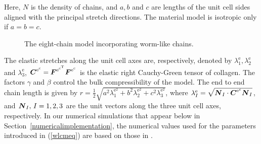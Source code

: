 Here, $N$ is
the density of chains, and $a,b$ and $c$ are lengths of the unit cell
sides aligned with the principal stretch directions. The material
model is isotropic only if $a=b=c$.

\begin{figure}
\caption{The eight-chain model incorporating worm-like chains.}\label{eightchain}
\end{figure}

The elastic stretches along the unit cell axes are, respectively,
denoted by
$\lambda_1^{\mathrm{e}},
\lambda_2^{\mathrm{e}}$ 
and 
$\lambda_3^{\mathrm{e}}$, $\mbox{\boldmath$ C$}^{\mathrm{e}^{\mathrm{c}}} =
\mbox{\boldmath$ F$}^{\mathrm{e}^{\mathrm{c}^{\mathrm{T}}}}
\mbox{\boldmath$ F$}^{\mathrm{e}^{\mathrm{c}}}$ is the elastic right Cauchy-Green
tensor of collagen. The factors $\gamma$ and $\beta$ control
the bulk compressibility of the model. The end to end chain length is
given by $r = \frac{1}{2}\sqrt{a^2\lambda_1^{\mathrm{e}^2} +
  b^2\lambda_2^{\mathrm{e}^2}+c^2\lambda_3^{\mathrm{e}^2}}$, where
$\lambda^\mathrm{e}_I = 
\sqrt{\mbox{\boldmath$ N$}_I\cdot\mbox{\boldmath$ C$}^{\mathrm{e}^{\mathrm{c}}}\mbox{\boldmath$ N$}_I}$, and $\mbox{\boldmath$ N$}_I,\,I =
1,2,3$ are the unit vectors along the three unit cell axes,
respectively. In our numerical simulations that appear below in
Section~\ref{numericalimplementation}, the numerical values used for
the parameters introduced in (\ref{wlcmeq}) are based on those in
\citet{kuhlremod05}.

